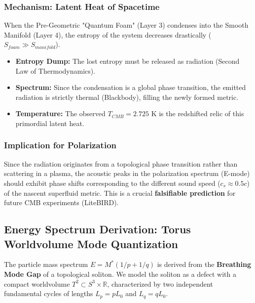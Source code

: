 \documentclass[a4paper,12pt]{article}
\begin{document}
\subsubsection{Mechanism: Latent Heat of Spacetime}
When the Pre-Geometric "Quantum Foam" (Layer 3) condenses into the Smooth Manifold (Layer 4), the entropy of the system decreases drastically ($S_{foam} \gg S_{manifold}$).
\begin{itemize}
    \item \textbf{Entropy Dump:} The lost entropy must be released as radiation (Second Law of Thermodynamics).
    \item \textbf{Spectrum:} Since the condensation is a global phase transition, the emitted radiation is strictly thermal (Blackbody), filling the newly formed metric.
    \item \textbf{Temperature:} The observed $T_{CMB} = 2.725$ K is the redshifted relic of this primordial latent heat.
\end{itemize}

\subsubsection{Implication for Polarization}
Since the radiation originates from a topological phase transition rather than scattering in a plasma, the acoustic peaks in the polarization spectrum (E-mode) should exhibit phase shifts corresponding to the different sound speed ($c_s \approx 0.5c$) of the nascent superfluid metric. This is a crucial \textbf{falsifiable prediction} for future CMB experiments (LiteBIRD).

\subsection{Energy Spectrum Derivation: Torus Worldvolume Mode Quantization}
The particle mass spectrum $E = M^*(1/p + 1/q)$ is derived from the \textbf{Breathing Mode Gap} of a topological soliton. We model the soliton as a defect with a compact worldvolume $T^2 \subset S^3 \times \mathbb{R}$, characterized by two independent fundamental cycles of lengths $L_p = p L_0$ and $L_q = q L_0$.
\end{document}
